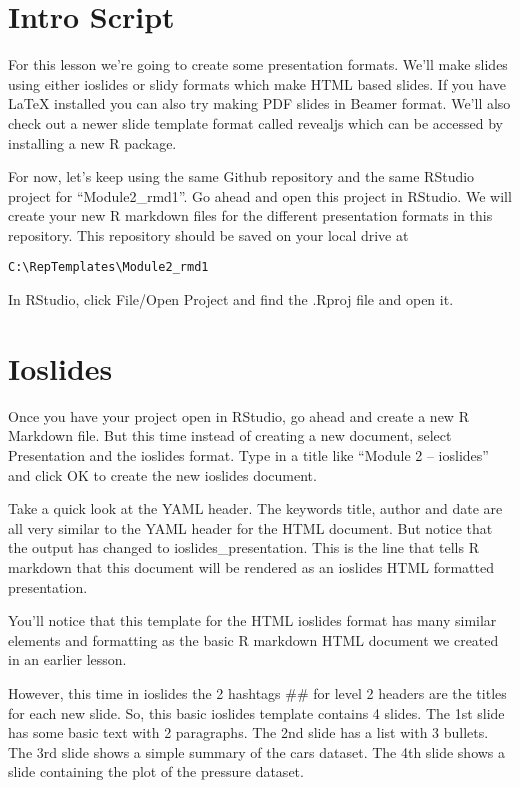 \documentclass[
]{book}
\begin{document}
\hypertarget{intro-script}{%
\section{Intro Script}\label{intro-script}}

For this lesson we're going to create some presentation formats. We'll make slides using either ioslides or slidy formats which make HTML based slides. If you have LaTeX installed you can also try making PDF slides in Beamer format. We'll also check out a newer slide template format called revealjs which can be accessed by installing a new R package.

For now, let's keep using the same Github repository and the same RStudio project for ``Module2\_rmd1''. Go ahead and open this project in RStudio. We will create your new R markdown files for the different presentation formats in this repository. This repository should be saved on your local drive at

\texttt{C:\textbackslash{}RepTemplates\textbackslash{}Module2\_rmd1}

In RStudio, click File/Open Project and find the .Rproj file and open it.

\hypertarget{ioslides}{%
\section{Ioslides}\label{ioslides}}

Once you have your project open in RStudio, go ahead and create a new R Markdown file. But this time instead of creating a new document, select Presentation and the ioslides format. Type in a title like ``Module 2 -- ioslides'' and click OK to create the new ioslides document.

Take a quick look at the YAML header. The keywords title, author and date are all very similar to the YAML header for the HTML document. But notice that the output has changed to ioslides\_presentation. This is the line that tells R markdown that this document will be rendered as an ioslides HTML formatted presentation.

You'll notice that this template for the HTML ioslides format has many similar elements and formatting as the basic R markdown HTML document we created in an earlier lesson.

However, this time in ioslides the 2 hashtags \#\# for level 2 headers are the titles for each new slide. So, this basic ioslides template contains 4 slides. The 1st slide has some basic text with 2 paragraphs. The 2nd slide has a list with 3 bullets. The 3rd slide shows a simple summary of the cars dataset. The 4th slide shows a slide containing the plot of the pressure dataset.
\end{document}
